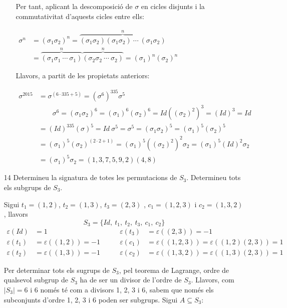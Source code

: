 \documentclass[a4paper, 11pt]{article}
\begin{document}
\begin{enumerate}
\begin{enumerate}
				Per tant, aplicant la descomposició de $\sigma$ en cicles disjunts i la commutativitat d'aquests cicles entre ells:
				
				$\displaystyle\begin{aligned}
					\sigma^n & = (\sigma_1 \sigma_2)^n = \overbrace{(\sigma_1 \sigma_2)(\sigma_1 \sigma_2) \:\cdots\:  (\sigma_1 \sigma_2)}^n \\ 
					& = \overbrace{(\sigma_1 \sigma_1 \:\cdots\: \sigma_1)}^n \overbrace{(\sigma_2 \sigma_2 \:\cdots\: \sigma_2)}^n = (\sigma_1)^n (\sigma_2)^n
				\end{aligned}$\medskip

				Llavors, a partit de les propietats anteriors:\medskip\par
				$\displaystyle\begin{aligned}
					\sigma^{2015} & = \sigma^{(6 \cdot 335 + 5)} = (\sigma^6)^{335} \sigma^5 \\
					& \qquad \sigma^6 = (\sigma_1 \sigma_2)^6 = (\sigma_1)^6 (\sigma_2)^6 = Id ((\sigma_2)^2)^3 = (Id)^3 = Id \\
					& = (Id)^{335} (\sigma)^5 = Id \ \sigma^5 = \sigma^5 = (\sigma_1 \sigma_2)^5 = (\sigma_1)^5 (\sigma_2)^5 \\
					& = (\sigma_1)^5 (\sigma_2)^{(2 \cdot 2 + 1)} = (\sigma_1)^5 ((\sigma_2)^2)^2 \sigma_2 = (\sigma_1)^5 (Id)^2 \sigma_2 \\
					& = (\sigma_1)^5 \sigma_2 = (1,3,7,5,9,2)(4,8)
				\end{aligned}$
		\end{enumerate}

	\item[14] Determineu la signatura de totes les permutacions de $S_3$. Determineu tots els subgrups de $S_3$.

		Sigui $t_1 = (1,2)$, $t_2 = (1,3)$, $t_3 = (2,3)$ , $c_1 = (1,2,3)$ i $c_2 = (1,3,2)$, llavors
		\[S_3 = \{Id,\ t_1,\ t_2,\ t_3,\ c_1,\ c_2\}\]
		\[\begin{aligned}
			\varepsilon (Id) & = 1 & \qquad \varepsilon (t_3) & = \varepsilon ((2,3)) = -1 \\
			\varepsilon (t_1) & = \varepsilon ((1,2)) = -1 & \qquad \varepsilon (c_1) & = \varepsilon ((1,2,3)) = \varepsilon ((1,2)(2,3)) = 1 \\
			\varepsilon (t_2) & = \varepsilon ((1,3)) = -1 & \qquad \varepsilon (c_2) & = \varepsilon ((1,3,2)) = \varepsilon ((1,3)(2,3)) = 1	
		\end{aligned}\]
		
		Per determinar tots els sugrups de $S_3$, pel teorema de Lagrange, ordre de qualsevol subgrup de $S_3$ ha de ser un divisor de l'ordre de $S_3$. Llavors, com $|S_3| = 6$ i 6 només té com a divisors 1, 2, 3 i 6, sabem que només els subconjunts d'ordre 1, 2, 3 i 6 poden ser subgrups. Sigui $A \subseteq S_3$:
		

\end{enumerate}
\end{document}

